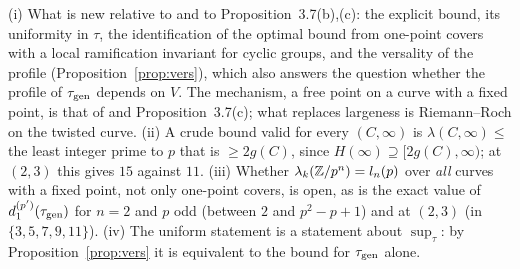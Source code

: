 \begin{remark}
(i) What is new relative to \cite{RV} and to Proposition~3.7(b),(c): the explicit bound,
its uniformity in $\tau$, the identification of the optimal bound from one-point covers
with a local ramification invariant for cyclic groups, and the versality of the profile
(Proposition~\ref{prop:vers}), which also answers the question whether the profile of
$\tau_{\mathrm{gen}}$ depends on $V$. The mechanism, a free point on a curve with a fixed point, is
that of \cite[Lemma~9.1]{RS} and Proposition~3.7(c); what replaces largeness is
Riemann--Roch on the twisted curve. (ii) A crude bound valid for every $(C,\infty)$ is
$\lambda(C,\infty)\le$ the least integer prime to $p$ that is $\ge2g(C)$, since
$H(\infty)\supseteq[2g(C),\infty)$; at $(2,3)$ this gives $15$ against $11$.
(iii) Whether $\lambda_k(\mathbb Z/p^n)=l_n(p)$ over \emph{all} curves with a fixed point, not
only one-point covers, is open, as is the exact value of $d_1^{(p')}(\tau_{\mathrm{gen}})$ for
$n=2$ and $p$ odd (between $2$ and $p^2-p+1$) and at $(2,3)$ (in $\{3,5,7,9,11\}$).
(iv) The uniform statement is a statement about $\sup_\tau$: by
Proposition~\ref{prop:vers} it is equivalent to the bound for $\tau_{\mathrm{gen}}$ alone.
\end{remark}

